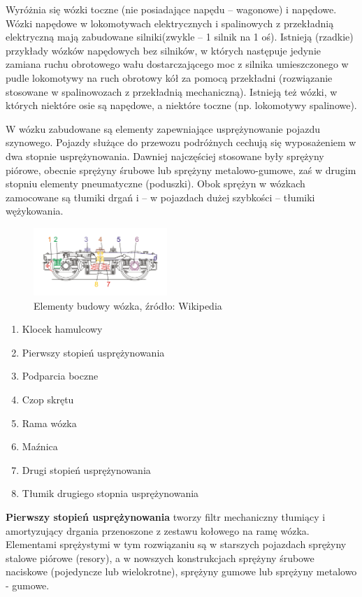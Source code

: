 Wyróżnia się wózki toczne (nie posiadające napędu – wagonowe) i napędowe. Wózki napędowe w lokomotywach elektrycznych i spalinowych z przekładnią elektryczną mają zabudowane silniki(zwykle – 1 silnik na 1 oś). Istnieją (rzadkie) przykłady wózków napędowych bez silników, w których następuje jedynie zamiana ruchu obrotowego wału dostarczającego moc z silnika umieszczonego w pudle lokomotywy na ruch obrotowy kół za pomocą przekładni (rozwiązanie stosowane w spalinowozach z przekładnią mechaniczną). Istnieją też wózki, w których niektóre osie są napędowe, a niektóre toczne (np. lokomotywy spalinowe).

W wózku zabudowane są elementy zapewniające usprężynowanie pojazdu szynowego. Pojazdy służące do przewozu podróżnych cechują się wyposażeniem w dwa stopnie usprężynowania. Dawniej najczęściej stosowane były sprężyny piórowe, obecnie sprężyny śrubowe lub sprężyny metalowo-gumowe, zaś w drugim stopniu elementy pneumatyczne (poduszki). Obok sprężyn w wózkach zamocowane są tłumiki drgań i – w pojazdach dużej
szybkości – tłumiki wężykowania. 
	\begin{figure}
		\includegraphics[width=0.45\textwidth]{skryptkierownik-img/skryptkierownik-img027.png}
		\caption{Elementy budowy wózka, źródło: Wikipedia}
		\label{fig:wozek}
	\end{figure}

\begin{enumerate}
	\item Klocek hamulcowy
	\item Pierwszy stopień usprężynowania
	\item Podparcia boczne
	\item Czop skrętu
	\item Rama wózka
	\item Maźnica
	\item Drugi stopień usprężynowania
	\item Tłumik drugiego stopnia usprężynowania
\end{enumerate}


\textbf{Pierwszy stopień usprężynowania} tworzy filtr mechaniczny tłumiący i amortyzujący drgania przenoszone z zestawu kołowego na ramę wózka. Elementami sprężystymi w tym rozwiązaniu są w starszych pojazdach sprężyny stalowe piórowe (resory), a w nowszych konstrukcjach sprężyny śrubowe naciskowe (pojedyncze lub wielokrotne), sprężyny gumowe lub sprężyny metalowo - gumowe. 

